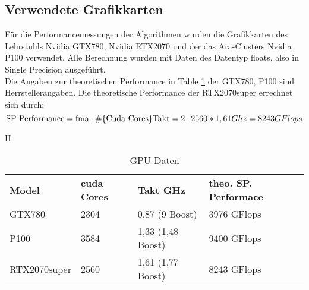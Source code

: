 \documentclass[10pt,a4paper]{article}
\begin{document}
	 \subsection{Verwendete Grafikkarten}
	 Für die Performancemessungen der Algorithmen wurden die Grafikkarten des Lehrstuhls Nvidia GTX780, Nvidia RTX2070 und der das Ara-Clusters Nvidia P100 verwendet. Alle Berechnung wurden mit Daten des Datentyp floats, also in Single Precision ausgeführt.\\
	 Die Angaben zur theoretischen Performance in Table \ref{GPU Daten} der GTX780, P100 sind Herrstellerangaben. Die theoretische Performance der RTX2070super errechnet sich durch: $$\text{SP Performance}= \text{fma}\cdot \# \{\text{Cuda Cores}\} \text{Takt}\\
	 =2\cdot 2560*1,61 Ghz\\
	 =8243 GFlops$$
	 \begin{table}{H}
	 	\centering
	 	\begin{tabular}{llll}
	 		\textbf{Model}  & \textbf{cuda Cores} & \textbf{Takt GHz}  & \textbf{theo. SP. Performace} \\
	 		GTX780           & 2304       & 0,87 (9 Boost) & 3976 GFlops   \\
	 		P100       & 3584 & 1,33 (1,48 Boost) &9400     GFlops        \\
	 		RTX2070super        & 2560 & 1,61 (1,77 Boost) &   8243 GFlops         \\
	 	\end{tabular}
	 	
	 	\caption{GPU Daten}
	 	\label{GPU Daten}
	 	
	 \end{table}
\end{document}
